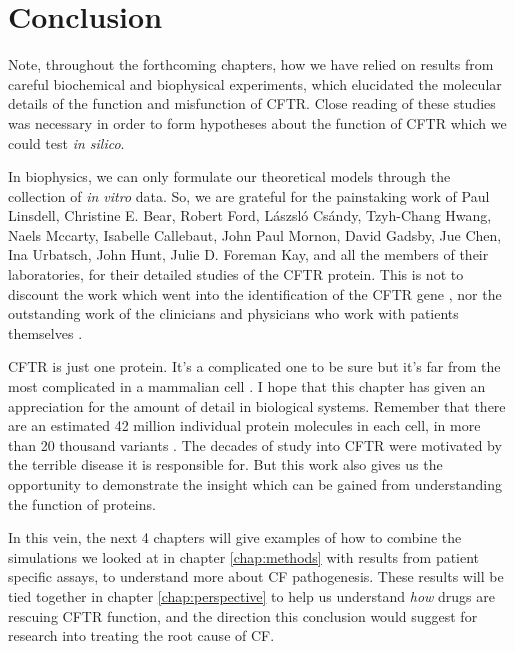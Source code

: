 \section{Conclusion}

Note, throughout the forthcoming chapters, how we have relied on results from careful biochemical and biophysical experiments, which elucidated the molecular details of the function and misfunction of CFTR. Close reading of these studies was necessary in order to form hypotheses about the function of CFTR which we could test \textit {in silico}. 

In biophysics, we can only formulate our theoretical models through the collection of \textit{in vitro} data. So, we are grateful for the painstaking work of Paul Linsdell, Christine E. Bear, Robert Ford, L\'aszsl\'o Cs\'andy, Tzyh-Chang Hwang, Naels Mccarty, Isabelle Callebaut, John Paul Mornon, David Gadsby, Jue Chen, Ina Urbatsch, John Hunt, Julie D. Foreman Kay, and all the members of their laboratories, for their detailed studies of the CFTR protein. This is not to discount the work which went into the identification of the CFTR gene \cite{riordan1989}, nor the outstanding work of the clinicians and physicians who work with patients themselves \cite{roberts1957}.  


CFTR is just one protein. It's a complicated one to be sure but it's far from the most complicated in a mammalian cell \cite{saotome2018, zalk2015, chen2018a}. I hope that this chapter has given an appreciation for the amount of detail in biological systems. Remember that there are an estimated 42 million individual protein molecules in each cell, in more than 20 thousand variants \cite{ho2018, salzberg2018}. The decades of study into CFTR were motivated by the terrible disease it is responsible for. But this work also gives us the opportunity to demonstrate the insight which can be gained from understanding the function of proteins. 

In this vein, the next 4 chapters will give examples of how to combine the simulations we looked at in chapter \ref{chap:methods} with results from patient specific assays, to understand more about CF pathogenesis. These results will be tied together in chapter \ref{chap:perspective} to help us understand \textit{how} drugs are rescuing CFTR function, and the direction this conclusion would suggest for research into treating the root cause of CF.
